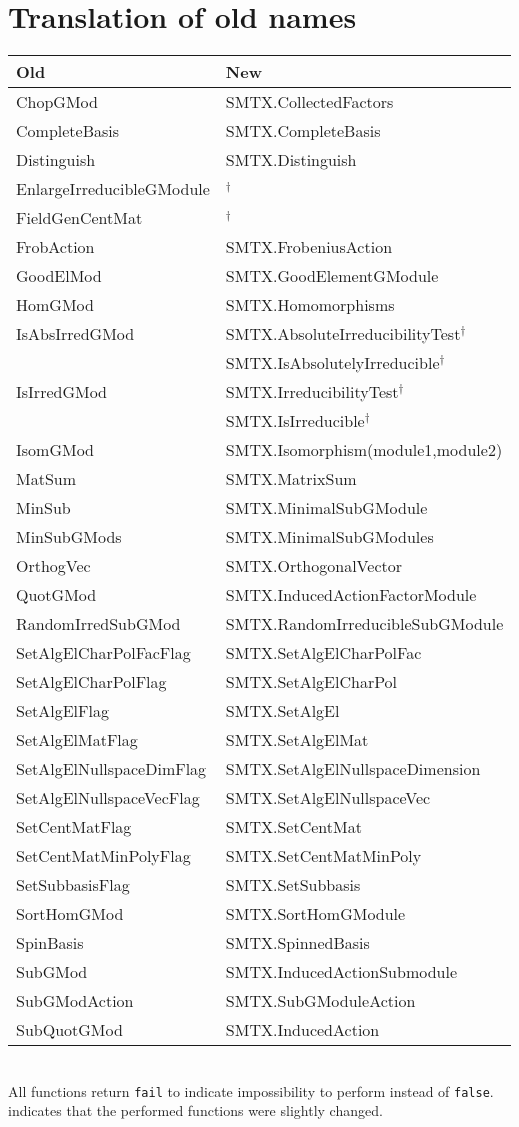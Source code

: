 \documentclass[12pt]{article}
\begin{document}
\section*{Translation of old names}
\begin{tabular}{ll}
Old&New\\
\hline
ChopGMod&SMTX.CollectedFactors\\
CompleteBasis&SMTX.CompleteBasis\\
Distinguish&SMTX.Distinguish\\
EnlargeIrreducibleGModule&${}^\dag$\\
FieldGenCentMat&${}^\dag$\\
FrobAction&SMTX.FrobeniusAction\\
GoodElMod&SMTX.GoodElementGModule\\
HomGMod&SMTX.Homomorphisms\\
IsAbsIrredGMod&SMTX.AbsoluteIrreducibilityTest${}^\dag$\\
&SMTX.IsAbsolutelyIrreducible${}^\dag$\\
IsIrredGMod&SMTX.IrreducibilityTest${}^\dag$\\
&SMTX.IsIrreducible${}^\dag$\\
IsomGMod&SMTX.Isomorphism(module1,module2)\\
MatSum&SMTX.MatrixSum\\
MinSub&SMTX.MinimalSubGModule\\
MinSubGMods&SMTX.MinimalSubGModules\\
OrthogVec&SMTX.OrthogonalVector\\
QuotGMod&SMTX.InducedActionFactorModule\\
RandomIrredSubGMod&SMTX.RandomIrreducibleSubGModule\\
SetAlgElCharPolFacFlag&SMTX.SetAlgElCharPolFac\\
SetAlgElCharPolFlag&SMTX.SetAlgElCharPol\\
SetAlgElFlag&SMTX.SetAlgEl\\
SetAlgElMatFlag&SMTX.SetAlgElMat\\
SetAlgElNullspaceDimFlag&SMTX.SetAlgElNullspaceDimension\\
SetAlgElNullspaceVecFlag&SMTX.SetAlgElNullspaceVec\\
SetCentMatFlag&SMTX.SetCentMat\\
SetCentMatMinPolyFlag&SMTX.SetCentMatMinPoly\\
SetSubbasisFlag&SMTX.SetSubbasis\\
SortHomGMod&SMTX.SortHomGModule\\
SpinBasis&SMTX.SpinnedBasis\\
SubGMod&SMTX.InducedActionSubmodule\\
SubGModAction&SMTX.SubGModuleAction\\
SubQuotGMod&SMTX.InducedAction\\
\end{tabular}\\
All functions return {\tt fail} to indicate impossibility to perform instead
of {\tt false}.\\
\dag indicates that the performed functions were slightly changed.
\end{document}
